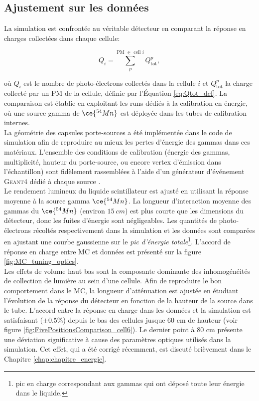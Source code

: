\subsection{Ajustement sur les données}

La simulation est confrontée au véritable détecteur en comparant la réponse en charges collectées dans chaque cellule:

\begin{equation}
    Q_{i} = \sum_p^{\textrm{PM $\in$ cell $i$}} Q_{\text{tot}}^{p},
    \label{eq:qtot_cell}
\end{equation}

où $Q_i$ est le nombre de photo-électrons collectés dans la cellule $i$ et $Q_{\text{tot}}^{p}$ la charge collecté par un PM de la cellule, définie par l'\'Equation \ref{eq:Qtot_def}. La comparaison est établie en exploitant les runs dédiés à la calibration en énergie, où une source gamma de $\ce{^{54}Mn}$ est déployée dans les tubes de calibration internes.\\

La géométrie des capsules porte-sources a été implémentée dans le code de simulation afin de reproduire au mieux les pertes d'énergie des gammas dans ces matériaux. L'ensemble des conditions de calibration (énergie des gammas, multiplicité, hauteur du porte-source, ou encore vertex d'émission dans l'échantillon) sont fidèlement rassemblées à l'aide d'un générateur d'événement \textsc{Geant4} dédié à chaque source \cite{docdb121}.\\

Le rendement lumineux du liquide scintillateur est ajusté en utilisant la réponse moyenne à la source gamma $\ce{^{54}Mn}$. La longueur d'interaction moyenne des gammas du $\ce{^{54}Mn}$ (environ $\SI{15}{cm}$) est plus courte que les dimensions du détecteur, donc les fuites d'énergie sont négligeables. Les quantités de photo-électrons récoltés respectivement dans la simulation et les données sont comparées en ajustant une courbe gaussienne sur le \textit{pic d'énergie totale}\footnote{pic en charge correspondant aux gammas qui ont déposé toute leur énergie dans le liquide.}. L'accord de réponse en charge entre MC et données est présenté sur la figure \ref{fig:MC_tuning_optics}.\\

Les effets de volume haut bas sont la composante dominante des inhomogénéités de collection de lumière au sein d'une cellule. Afin de reproduire le bon comportement dans le MC, la longueur d'atténuation est ajustée en étudiant l'évolution de la réponse du détecteur en fonction de la hauteur de la source dans le tube. L'accord entre la réponse en charge dans les données et la simulation est satisfaisant ($\pm 0.5 \%$) depuis le bas des cellules jusque 60 cm de hauteur (voir figure \ref{fig:FivePositionsComparison_cell6}). Le dernier point à 80 cm présente une déviation significative à cause des paramètres optiques utilisés dans la simulation. Cet effet, qui a été corrigé récemment, est discuté brièvement dans le Chapitre \ref{chap:chapitre_energie}.\\

